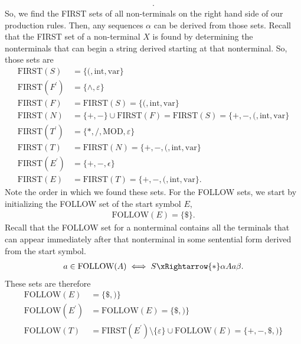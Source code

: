 \documentclass{report}
\begin{document}
\begin{itemize}
\begin{align*}
            .\end{align*}
            So, we find the FIRST sets of all non-terminals on the right hand side of our production rules. Then, any sequences $\alpha$ can be derived from those sets. Recall that the FIRST set of a non-terminal $X$ is found by determining the nonterminals that can begin a string derived starting at that nonterminal. So, those sets are
            \begin{align*}
                \text{FIRST}(S) &= \{(,\text{int}, \text{var}\} \\
                \text{FIRST}(F^{\prime}) &= \{\land, \varepsilon\} \\
                \text{FIRST}(F) &=  \text{FIRST}(S) = \{(, \text{int}, \text{var}\} \\
                \text{FIRST}(N) &= \{+,-\} \cup \text{FIRST}(F) = \text{FIRST}(S) = \{+,-,(,\text{int}, \text{var}\} \\
                \text{FIRST}(T^{\prime}) &= \{*, /, \text{MOD}, \varepsilon\} \\
                \text{FIRST}(T) &= \text{FIRST}(N) = \{+,-,(,\text{int}, \text{var}\} \\
                \text{FIRST}(E^{\prime}) &= \{+,-,\epsilon\} \\
                \text{FIRST}(E) &=\text{FIRST}(T) = \{+,-,(, \text{int}, \text{var}\}
            .\end{align*}
            Note the order in which we found these sets. For the FOLLOW sets, we start by initializing the FOLLOW set of the start symbol $E$,
            \begin{align*}
                \text{FOLLOW}(E) = \{\$\}
            .\end{align*}
            Recall that the FOLLOW set for a nonterminal contains all the terminals that can appear immediately after that nonterminal in some sentential form derived from the start symbol.
            \begin{align*}
                a \in \text{FOLLOW}(A) \iff S \xRightarrow{*} \alpha Aa \beta
            .\end{align*}
            These sets are therefore
            \begin{align*}
                \text{FOLLOW}(E) &= \{\$, )\}\\
                \text{FOLLOW}(E^{\prime}) &= \text{FOLLOW}(E) = \{\$, )\}\\
                \text{FOLLOW}(T) &= \text{FIRST}(E^{\prime}) \setminus \{\varepsilon\} \cup \text{FOLLOW}(E) = \{+,-,\$, )\}\\

\end{align*}
\end{itemize}
\end{document}
